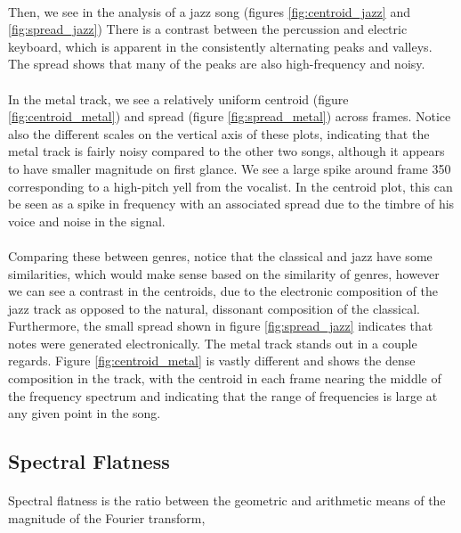 \documentclass[11pt,a4paper]{article}
\begin{document}
\paragraph*{} Then, we see in the analysis of a jazz song (figures \ref{fig:centroid_jazz} and \ref{fig:spread_jazz}) There is a contrast between the percussion and electric keyboard, which is apparent in the consistently alternating peaks and valleys. The spread shows that many of the peaks are also high-frequency and noisy.
\paragraph*{} In the metal track, we see a relatively uniform centroid (figure \ref{fig:centroid_metal}) and spread (figure \ref{fig:spread_metal}) across frames. Notice also the different scales on the vertical axis of these plots, indicating that the metal track is fairly noisy compared to the other two songs, although it appears to have smaller magnitude on first glance. We see a large spike around frame 350 corresponding to a high-pitch yell from the vocalist. In the centroid plot, this can be seen as a spike in frequency with an associated spread due to the timbre of his voice and noise in the signal.
\paragraph*{} Comparing these between genres, notice that the classical and jazz have some similarities, which would make sense based on the similarity of genres, however we can see a contrast in the centroids, due to the electronic composition of the jazz track as opposed to the natural, dissonant composition of the classical. Furthermore, the small spread shown in figure \ref{fig:spread_jazz} indicates that notes were generated electronically. The metal track stands out in a couple regards. Figure \ref{fig:centroid_metal} is vastly different and shows the dense composition in the track, with the centroid in each frame nearing the middle of the frequency spectrum and indicating that the range of frequencies is large at any given point in the song.

\subsection{Spectral Flatness}
\paragraph*{} Spectral flatness is the ratio between the geometric and arithmetic means of the magnitude of the Fourier transform,
\end{document}

